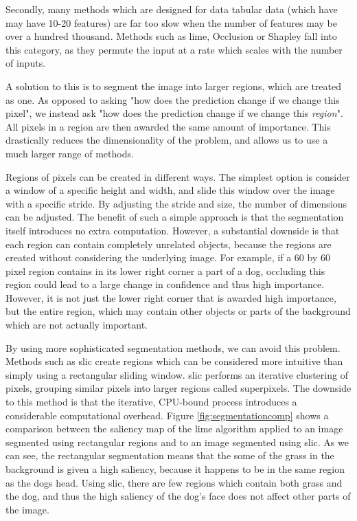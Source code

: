 \documentclass[UKenglish]{uiomasterthesis} %
\theoremstyle{definition}
\begin{document}
Secondly, many methods which are designed for data tabular data (which have may have 10-20 features) are far too slow when the number of features may be over a hundred thousand. Methods such as \ac{lime}, Occlusion or Shapley fall into this category, as they permute the input at a rate which scales with the number of inputs.

A solution to this is to segment the image into larger regions, which are treated as one. As opposed to asking "how does the prediction change if we change this pixel", we instead ask "how does the prediction change if we change this {\it region}". All pixels in a region are then awarded the same amount of importance. This drastically reduces the dimensionality of the problem, and allows us to use a much larger range of methods.

Regions of pixels can be created in different ways. The simplest option is consider a window of a specific height and width, and slide this window over the image with a specific stride. By adjusting the stride and size, the number of dimensions can be adjusted. The benefit of such a simple approach is that the segmentation itself introduces no extra computation. However, a substantial downside is that each region can contain completely unrelated objects, because the regions are created without considering the underlying image. For example, if a 60 by 60 pixel region contains in its lower right corner a part of a dog, occluding this region could lead to a large change in confidence and thus high importance. However, it is not just the lower right corner that is awarded high importance, but the entire region, which may contain other objects or parts of the background which are not actually important.

By using more sophisticated segmentation methods, we can avoid this problem. Methods such as \ac{slic} \cite{slic} create regions which can be considered more intuitive than simply using a rectangular sliding window. \ac{slic} performs an iterative clustering of pixels, grouping similar pixels into larger regions called superpixels. The downside to this method is that the iterative, CPU-bound process introduces a considerable computational overhead. Figure \ref{fig:segmentationcomp} shows a comparison between the saliency map of the \ac{lime} algorithm applied to an image segmented using rectangular regions and to an image segmented using \ac{slic}. As we can see, the rectangular segmentation means that the some of the grass in the background is given a high saliency, because it happens to be in the same region as the dogs head. Using \ac{slic}, there are few regions which contain both grass and the dog, and thus the high saliency of the dog's face does not affect other parts of the image.
\end{document}
